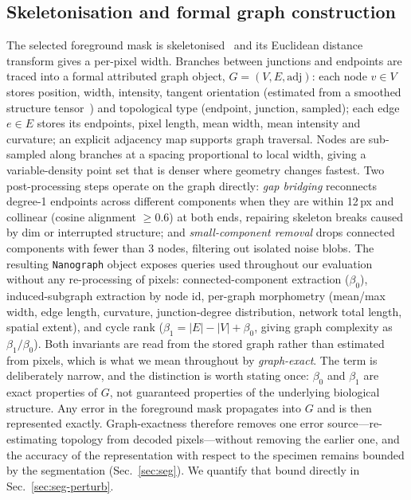 \documentclass[10pt,a4paper]{article}
\begin{document}
\subsection{Skeletonisation and formal graph construction}
The selected foreground mask is skeletonised~\cite{lee} and its Euclidean
distance transform gives a per-pixel width. Branches between junctions and
endpoints are traced into a formal attributed graph object,
$G=(V,E,\mathrm{adj})$: each node $v\in V$ stores position, width, intensity,
tangent orientation (estimated from a smoothed structure
tensor~\cite{bigun1987structuretensor}) and topological type (endpoint,
junction, sampled); each edge $e\in E$ stores its endpoints, pixel length,
mean width, mean intensity and curvature; an explicit adjacency map supports
graph traversal. Nodes are sub-sampled along branches at a spacing
proportional to local width, giving a variable-density point set that is
denser where geometry changes fastest. Two post-processing steps operate on
the graph directly: \emph{gap bridging} reconnects degree-1 endpoints across
different components when they are within 12\,px and collinear (cosine
alignment $\geq 0.6$) at both ends, repairing skeleton breaks caused by dim
or interrupted structure; and \emph{small-component removal} drops connected
components with fewer than 3 nodes, filtering out isolated noise blobs. The
resulting \texttt{Nanograph} object exposes queries used throughout our
evaluation without any re-processing of pixels: connected-component
extraction ($\beta_0$), induced-subgraph extraction by node id, per-graph
morphometry (mean/max width, edge length, curvature, junction-degree
distribution, network total length, spatial extent), and cycle rank
($\beta_1 = |E| - |V| + \beta_0$, giving graph complexity as
$\beta_1/\beta_0$). Both invariants are read from the stored graph rather
than estimated from pixels, which is what we mean throughout by
\emph{graph-exact}. The term is deliberately narrow, and the distinction is
worth stating once: $\beta_0$ and $\beta_1$ are exact properties of $G$, not
guaranteed properties of the underlying biological structure. Any error in
the foreground mask propagates into $G$ and is then represented exactly.
Graph-exactness therefore removes one error source---re-estimating topology
from decoded pixels---without removing the earlier one, and the accuracy of
the representation with respect to the specimen remains bounded by the
segmentation (Sec.~\ref{sec:seg}). We quantify that bound directly in
Sec.~\ref{sec:seg-perturb}.
\end{document}
